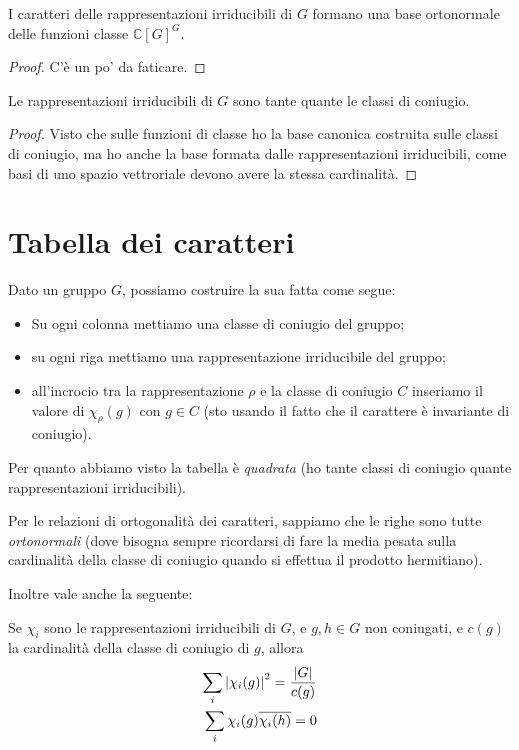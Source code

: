 \documentclass[a4paper,10pt,oneside]{math_article}
\newcommand{\class}[1]{\mathbb C[#1]^#1}
\let\conj\overline
\begin{document}
    \begin{mytheorem}
     I caratteri delle rappresentazioni irriducibili di $G$ formano una base ortonormale delle funzioni classe $\class G$.
    \end{mytheorem}
    
    \begin{proof}
     C'è un po' da faticare.
    \end{proof}

    
    \begin{mytheorem}
     Le rappresentazioni irriducibili di $G$ sono tante quante le classi di coniugio.
    \end{mytheorem}

    \begin{proof}
     Visto che sulle funzioni di classe ho la base canonica costruita sulle classi di coniugio, ma ho anche la base formata dalle rappresentazioni irriducibili, come basi di uno spazio vettroriale devono avere la stessa cardinalità.
    \end{proof}

    \section{Tabella dei caratteri}
    
    Dato un gruppo $G$, possiamo costruire la sua  fatta come segue:
    \begin{itemize}
     \item Su ogni colonna mettiamo una classe di coniugio del gruppo;
     \item su ogni riga mettiamo una rappresentazione irriducibile del gruppo;
     \item all'incrocio tra la rappresentazione $\rho$ e la classe di coniugio $C$ inseriamo il valore di $\chi_\rho(g)$ con $g\in C$ (sto usando il fatto che il carattere è invariante di coniugio).
    \end{itemize}

    Per quanto abbiamo visto la tabella è \emph{quadrata} (ho tante classi di coniugio quante rappresentazioni irriducibili).
    
    Per le relazioni di ortogonalità dei caratteri, sappiamo che le righe sono tutte \emph{ortonormali} (dove bisogna sempre ricordarsi di fare la media pesata sulla cardinalità della classe di coniugio quando si effettua il prodotto hermitiano).
    
    Inoltre vale anche la seguente:
    \begin{myprop}
     Se $\chi_i$ sono le rappresentazioni irriducibili di $G$, e $g,h\in G$ non coniugati, e $c(g)$ la cardinalità della classe di coniugio di $g$, allora 
     \begin{align*}
	\sum_i \abs{\chi_i(g)}^2 = \frac {\abs G}{c(g)}\\
	\sum_i \chi_i(g)\conj{\chi_i(h)} = 0
     \end{align*}
    \end{myprop}
\end{document}
